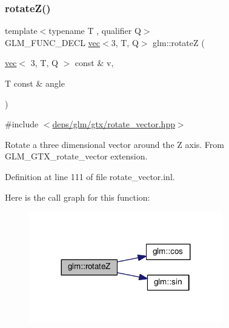 \subsubsection{\texorpdfstring{rotate\+Z()}{rotateZ()}\hspace{0.1cm}{\footnotesize\ttfamily [1/2]}}
{\footnotesize\ttfamily template$<$typename T , qualifier Q$>$ \\
G\+L\+M\+\_\+\+F\+U\+N\+C\+\_\+\+D\+E\+CL \hyperlink{structglm_1_1vec}{vec}$<$3, T, Q$>$ glm\+::rotateZ (\begin{DoxyParamCaption}\item[{\hyperlink{structglm_1_1vec}{vec}$<$ 3, T, Q $>$ const \&}]{v,  }\item[{T const \&}]{angle }\end{DoxyParamCaption})}



{\ttfamily \#include $<$\hyperlink{rotate__vector_8hpp}{deps/glm/gtx/rotate\+\_\+vector.\+hpp}$>$}

Rotate a three dimensional vector around the Z axis. From G\+L\+M\+\_\+\+G\+T\+X\+\_\+rotate\+\_\+vector extension. 

Definition at line 111 of file rotate\+\_\+vector.\+inl.

Here is the call graph for this function\+:
\nopagebreak
\begin{figure}[H]
\begin{center}
\leavevmode
\includegraphics[width=239pt]{df/d02/group__gtx__rotate__vector_ga5a048838a03f6249acbacb4dbacf79c4_cgraph}
\end{center}
\end{figure}
\mbox{\label{group__gtx__rotate__vector_ga923b75c6448161053768822d880702e6}} 
